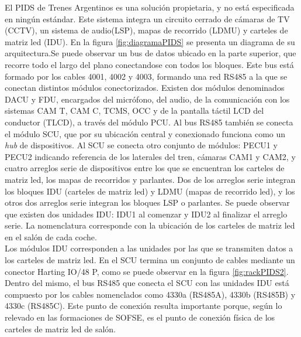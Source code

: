 El PIDS de Trenes Argentinos es una solución propietaria, y no está especificada en ningún estándar. Este sistema integra un circuito cerrado de cámaras de TV (CCTV), un sistema de audio(LSP), mapas de recorrido (LDMU) y carteles de matriz led (IDU). En la figura \ref{fig:diagramaPIDS} se presenta un diagrama de su arquitectura.Se puede observar un bus de datos ubicado en la parte superior, que recorre todo el largo del plano conectandose con todos los bloques. Este bus está formado por los cables 4001, 4002 y 4003, formando una red RS485 a la que se conectan distintos módulos conectorizados. Existen dos módulos denominados DACU y FDU, encargados del micrófono, del audio, de la comunicación con los sistemas CAM T, CAM C, TCMS, OCC y de la pantalla táctil LCD del conductor (TLCD), a través del módulo PCU. Al bus RS485 también se conecta el módulo SCU, que por su ubicación central y conexionado funciona como un \textit{hub} de dispositivos. Al SCU se conecta otro conjunto de módulos: PECU1 y PECU2 indicando referencia de los laterales del tren, cámaras CAM1 y CAM2, y cuatro arreglos serie de dispositivos entre los que se encuentran los carteles de matriz led, los mapas de recorridos y parlantes. Dos de los arreglos serie integran los bloques IDU (carteles de matriz led) y LDMU (mapas de recorrido led), y los otros dos arreglos serie integran los bloques LSP o parlantes. Se puede observar que existen dos unidades IDU: IDU1 al comenzar y IDU2 al finalizar el arreglo serie. La nomenclatura corresponde con la ubicación de los carteles de matriz led en el salón de cada coche. \\

Los módulos IDU corresponden a las unidades por las que se transmiten datos a los carteles de matriz led. En el SCU termina un conjunto de cables mediante un conector Harting IO/48 P, como se puede observar en la figura \ref{fig:rackPIDS2}. Dentro del mismo, el bus RS485 que conecta el SCU con las unidades IDU está compuesto por los cables nomenclados como 4330a (RS485A), 4330b (RS485B) y 4330c (RS485C). Este punto de conexión resulta importante porque, según lo relevado en las formaciones de SOFSE, es el punto de conexión física de los carteles de matriz led de salón.\\

